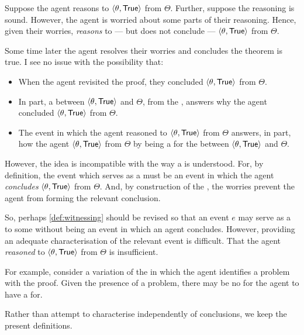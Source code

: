 \begin{note}
{    Suppose the agent reasons to \(\pv{\theta}{\valI{True}}\) from \(\Theta\).
    Further, suppose the \agents{} reasoning is sound.
    However, the agent is worried about some parts of their reasoning.
    Hence, given their worries, \emph{reasons} to --- but does not conclude --- \(\pv{\theta}{\valI{True}}\) from \(\Theta\).

    Some time later the agent resolves their worries and concludes the theorem is true.
    I see no issue with the possibility that:
    \begin{itemize}[noitemsep]
    \item
      When the agent revisited the proof, they concluded \(\pv{\theta}{\valI{True}}\) from \(\Theta\).
    \item
      In part, a \ros{} between \(\pv{\theta}{\valI{True}}\) and \(\Theta\), from the \agpe{}, answers why the agent concluded \(\pv{\theta}{\valI{True}}\) from \(\Theta\).
    \item
      The event in which the agent reasoned to \(\pv{\theta}{\valI{True}}\) from \(\Theta\) answers, in part, how the agent \(\pv{\theta}{\valI{True}}\) from \(\Theta\) by being a \wit{} for the \ros{} between \(\pv{\theta}{\valI{True}}\) and \(\Theta\).
    \end{itemize}

    However, the idea is incompatible with the way a  is understood.
    For, by definition, the event which serves as a  must be an event in which the agent \emph{concludes} \(\pv{\theta}{\valI{True}}\) from \(\Theta\).
    And, by construction of the , the \agents{} worries prevent the agent from forming the relevant conclusion.

    So, perhaps \autoref{def:witnessing} should be revised so that an event \(e\) may serve as a \wit{} to some \ros{} without being an event in which an agent concludes.
    However, providing an adequate characterisation of the relevant event is difficult.
    That the agent \emph{reasoned} to \(\pv{\theta}{\valI{True}}\) from \(\Theta\) is insufficient.

    For example, consider a variation of the \scen{} in which the agent identifies a problem with the proof.
    Given the presence of a problem, there may be no \ros{} for the agent to have a  for.

    Rather than attempt to characterise  independently of conclusions, we keep the present definitions.
  }
\end{note}

